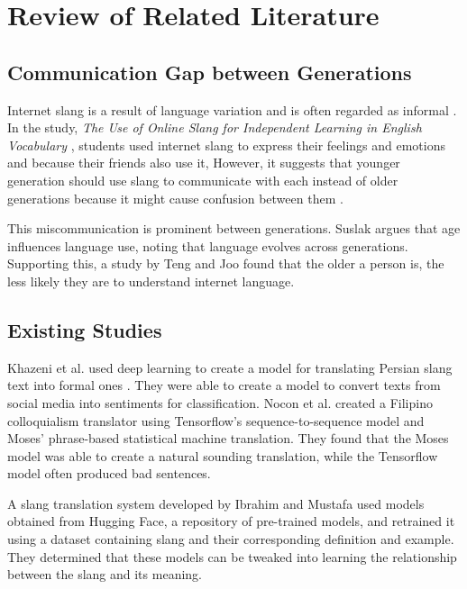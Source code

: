 \chapter{Review of Related Literature}
\label{sec:relatedlit}

\section{Communication Gap between Generations}
Internet slang is a result of language variation and is often regarded as informal \cite{Liu_Gui_Zuo_Dai_2019}. In the study, \textit{The Use of Online Slang for Independent Learning in English Vocabulary} \cite{Ambarsari_Amrullah_Nawawi_2020}, students used internet slang to express their feelings and emotions and because their friends also use it, However, it suggests that younger generation should use slang to communicate with each instead of older generations because it might cause confusion between them \cite{Jeresano_Carretero_2022}.

This miscommunication is prominent between generations. Suslak \cite{SUSLAK2009199} argues that age influences language use, noting that language evolves across generations. Supporting this, a study by Teng and Joo \cite{Teng_Joo2023} found that the older a person is, the less likely they are to understand internet language.


\section{Existing Studies}
Khazeni et al. used deep learning to create a model for translating Persian slang text into formal ones \cite{Khazeni}. They were able to create a model to convert texts from social media into sentiments for classification. Nocon et al. \cite{Nocon_Kho_Arroyo_2018} created a Filipino colloquialism translator using Tensorflow’s sequence-to-sequence model and Moses’ phrase-based statistical machine translation. They found that the Moses model was able to create a natural sounding translation, while the Tensorflow model often produced bad sentences.

A slang translation system developed by Ibrahim and Mustafa \cite{Abdulstar_Ibrahim_Shareef_Mustafa_2023} used models obtained from Hugging Face, a repository of pre-trained models, and retrained it using a dataset containing slang and their corresponding definition and example. They determined that these models can be tweaked into learning the relationship between the slang and its meaning.

